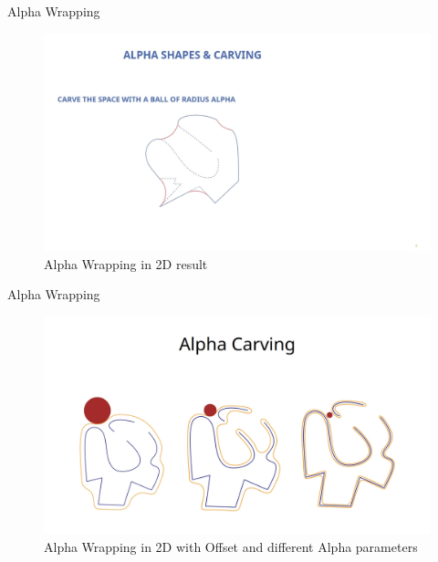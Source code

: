 \documentclass[10pt]{beamer}
\begin{document}
\begin{frame}{Alpha Wrapping}
  \begin{figure}[H]
    \centering
    \includegraphics[width=1.1\textwidth]{images/alpha-wrapping2.jpg}
    \caption{Alpha Wrapping in 2D result}
\end{figure}
\end{frame}

\begin{frame}{Alpha Wrapping}
  \begin{figure}[H]
    \centering
    \includegraphics[width=1.1\textwidth]{images/alpha-wrapping3.jpg}
    \caption{Alpha Wrapping in 2D with Offset and different Alpha parameters}
\end{figure}
\end{frame}
\end{document}

